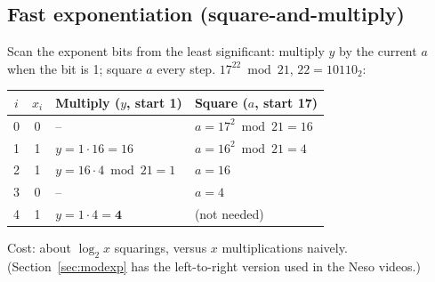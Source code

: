 \subsection{Fast exponentiation (square-and-multiply)}
Scan the exponent bits from the least significant: multiply $y$ by the current $a$ when the bit is 1; square $a$ every step. $17^{22} \bmod 21$, $22 = 10110_2$:
\begin{center}\small
\begin{tabular}{@{}ccll@{}}
\toprule
$i$ & $x_i$ & Multiply ($y$, start 1) & Square ($a$, start 17)\\
\midrule
0 & 0 & -- & $a = 17^2 \bmod 21 = 16$\\
1 & 1 & $y = 1 \cdot 16 = 16$ & $a = 16^2 \bmod 21 = 4$\\
2 & 1 & $y = 16 \cdot 4 \bmod 21 = 1$ & $a = 16$\\
3 & 0 & -- & $a = 4$\\
4 & 1 & $y = 1 \cdot 4 = \mathbf{4}$ & (not needed)\\
\bottomrule
\end{tabular}
\end{center}
Cost: about $\log_2 x$ squarings, versus $x$ multiplications naively. (Section~\ref{sec:modexp} has the left-to-right version used in the Neso videos.)


